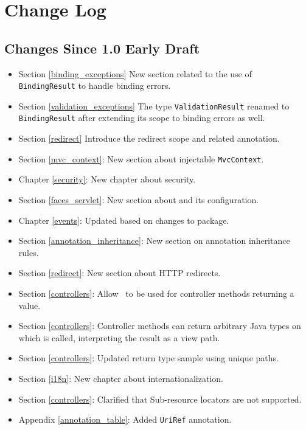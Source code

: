 \chapter{Change Log}

\section{Changes Since 1.0 Early Draft}

\begin{itemize}
\item Section \ref{binding_exceptions} New section related to the use of {\tt BindingResult}
to handle binding errors.
\item Section \ref{validation_exceptions} The type {\tt ValidationResult} renamed to 
{\tt BindingResult} after extending its scope to binding errors as well. 
\item Section \ref{redirect} Introduce the redirect scope and related annotation.
\item Section \ref{mvc_context}: New section about injectable {\tt MvcContext}.
\item Chapter \ref{security}: New chapter about security.
\item Section \ref{faces_servlet}: New section about  and its configuration.
\item Chapter \ref{events}: Updated based on changes to  package.
\item Section \ref{annotation_inheritance}: New section on annotation inheritance rules.
\item Section \ref{redirect}: New section about HTTP redirects.
\item Section \ref{controllers}: Allow \View\ to be used for controller methods returning a 
 value. 
\item Section \ref{controllers}: Controller methods can return arbitrary Java types on which 
 is called, interpreting the result as a view path.
\item Section \ref{controllers}: Updated return type sample using unique paths.
\item Section \ref{i18n}: New chapter about internationalization.
\item Section \ref{controllers}: Clarified that Sub-resource locators are not supported.
\item Appendix \ref{annotation_table}: Added {\tt UriRef} annotation.
\end{itemize}
